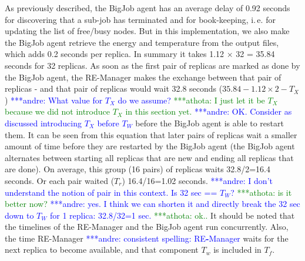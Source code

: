 \documentclass{rspublic}
\newcommand{\alnote}[1]{ {\textcolor{blue} { ***andre: #1 }}}
\newcommand{\athotanote}[1]{ {\textcolor{green} { ***athota: #1 }}}
\newcommand{\alnote}[1]{}
\newcommand{\athotanote}[1]{}
\begin{document}
As previously described, the BigJob agent has an average delay of 0.92 seconds 
for discovering that a sub-job has terminated and for book-keeping, i.\,e. for
updating the list of free/busy nodes. But in this
implementation, we also make the BigJob agent retrieve the energy
and temperature from the output files, which adds 0.2 seconds per
replica. In summary it takes 1.12 $\times$ 32 = 35.84 seconds for 32
replicas. 
As soon as the first pair of replicas are marked as done by the
BigJob agent, the RE-Manager makes the exchange between that pair of replicas 
- and that pair of replicas would wait 32.8 seconds ($35.84-1.12\times2-T_X$) 
\alnote{What value for $T_{X}$ do we assume?} \athotanote{I just let it be $T_X$ because we did not introduce $T_X$ in this section yet.} \alnote{OK. Consider as discussed introducing $T_X$ before $T_W$}
before the BigJob agent is able to restart them. It can be seen from this 
equation that later pairs of replicas wait a smaller amount of time before 
they are restarted by the BigJob agent (the BigJob agent alternates between 
starting all replicas that are new and ending all replicas that are done). 
On average, this group (16 pairs) of replicas waits  32.8/2=16.4 seconds. 
Or each pair waited ($T_r$) 16.4/16=1.02 seconds.  \alnote{I don't understand 
the notion of pair in this context. Is 32 sec == $T_W$?}\athotanote{is it better now?}\alnote{yes. I think
we can shorten it and directly break the 32 sec down to $T_W$ for 1 replica: 32.8/32=1 sec.} \athotanote{ok..}
It should be noted that the timelines of the RE-Manager and the BigJob 
agent run concurrently. Also, the time RE-Manager\alnote{consistent spelling: RE\textbf{-}Manager} 
waits for the next replica to  become available, and that component $T_w$ is included in $T_f$.
\end{document}
